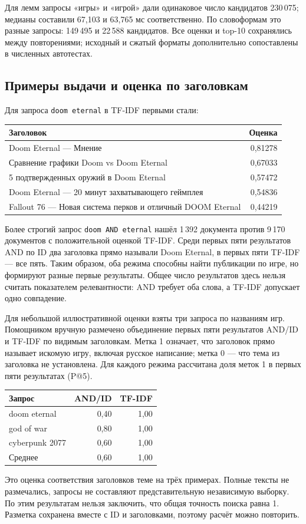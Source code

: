 \documentclass[12pt,a4paper]{article}
\begin{document}
Для лемм запросы «игры» и «игрой» дали одинаковое число кандидатов
230\,075; медианы составили 67,103 и 63,765 мс соответственно.
По словоформам это разные запросы: 149\,495 и 22\,588 кандидатов.
Все оценки и top-10 сохранялись между повторениями; исходный и сжатый
форматы дополнительно сопоставлены в численных автотестах.

\subsection{Примеры выдачи и оценка по заголовкам}
Для запроса \texttt{doom eternal} в TF-IDF первыми стали:
\begin{center}
\small
\begin{tabular}{@{}p{115mm}r@{}}
\toprule
Заголовок & Оценка\\
\midrule
Doom Eternal --- Мнение & 0,81278\\
Сравнение графики Doom vs Doom Eternal & 0,67033\\
5 подтвержденных оружий в Doom Eternal & 0,57472\\
Doom Eternal --- 20 минут захватывающего геймплея & 0,54836\\
Fallout 76 --- Новая система перков и отличный DOOM Eternal & 0,44219\\
\bottomrule
\end{tabular}
\end{center}
Более строгий запрос \texttt{doom AND eternal} нашёл 1\,392 документа
против 9\,170 документов с положительной оценкой TF-IDF.
Среди первых пяти результатов AND по ID два заголовка прямо называли
Doom Eternal, в первых пяти TF-IDF --- все пять. Таким образом, оба
режима способны найти публикации по игре, но формируют разные первые
результаты. Общее число результатов здесь нельзя считать показателем
релевантности: AND требует оба слова, а TF-IDF допускает одно совпадение.

Для небольшой иллюстративной оценки взяты три запроса по названиям игр.
Помощником вручную размечено объединение первых пяти результатов AND/ID и TF-IDF
по видимым заголовкам. Метка 1 означает, что заголовок прямо называет искомую
игру, включая русское написание; метка 0 --- что тема из заголовка не установлена.
Для каждого режима рассчитана доля меток 1 в первых пяти результатах (P@5).
\begin{center}
\begin{tabular}{@{}lrr@{}}
\toprule
Запрос & AND/ID & TF-IDF\\
\midrule
doom eternal & 0,40 & 1,00\\
god of war & 0,80 & 1,00\\
cyberpunk 2077 & 0,60 & 1,00\\
\midrule
Среднее & 0,60 & 1,00\\
\bottomrule
\end{tabular}
\end{center}
Это оценка соответствия заголовков теме на трёх примерах. Полные тексты
не размечались, запросы не составляют представительную независимую выборку.
По этим результатам нельзя заключить, что общая точность поиска равна 1.
Разметка сохранена вместе с ID и заголовками, поэтому расчёт можно повторить.
\end{document}

